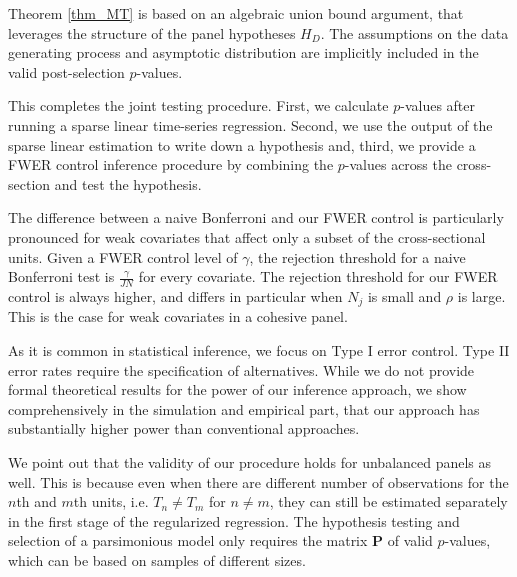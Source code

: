 \documentclass[11pt]{article}
\begin{document}
	Theorem \ref{thm_MT} is based on an algebraic union bound argument, that leverages the structure of the panel hypotheses $H_D$. The assumptions on the data generating process and asymptotic distribution are implicitly included in the valid post-selection $p$-values.
	
	
	This completes the joint testing procedure. First, we calculate $p$-values after running a sparse linear time-series regression. Second, we use the output of the sparse linear estimation to write down a hypothesis and, third, we provide a FWER control inference procedure by combining the $p$-values across the cross-section and test the hypothesis.
	
	The difference between a naive Bonferroni and our FWER control is particularly pronounced for weak covariates that affect only a subset of the cross-sectional units. Given a FWER control level of $\gamma$, the rejection threshold for a naive Bonferroni test is $\frac{\gamma}{J N}$ for every covariate. The rejection threshold for our FWER control is always higher, and differs in particular when $N_j$ is small and $\rho$ is large. This is the case for weak covariates in a cohesive panel. 
	
	As it is common in statistical inference, we focus on Type I error control. Type II error rates require the specification of alternatives. While we do not provide formal theoretical results for the power of our inference approach, we show comprehensively in the simulation and empirical part, that our approach has substantially higher power than conventional approaches. 
	
	
	We point out that the validity of our procedure holds for unbalanced panels as well. This is because even when there are different number of observations for the $n$th and $m$th units, i.e. $T_n\neq T_{m}$ for $n \neq m$, they can still be estimated separately in the first stage of the regularized regression. The hypothesis testing and selection of a parsimonious model only requires the matrix $\bm{P}$ of valid $p$-values, which can be based on samples of different sizes. 
	
	
	
	
	
\end{document}
